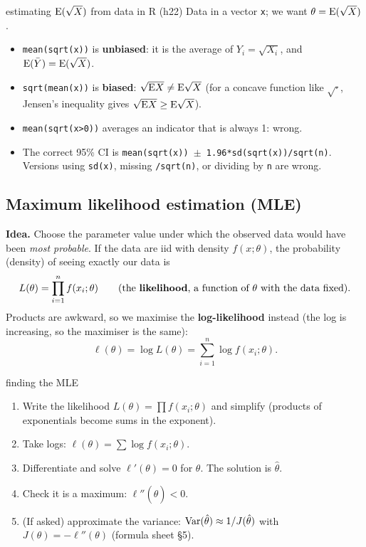 \begin{example}{estimating $\mathrm{E}(\sqrt X)$ from data in R (h22)}
Data in a vector \texttt{x}; we want $\theta = \mathrm{E}(\sqrt X)$.
\begin{itemize}
  \item \texttt{mean(sqrt(x))} is \textbf{unbiased}: it is the average of $Y_i = \sqrt{X_i}$, and $\mathrm{E}(\bar Y) = \mathrm{E}(\sqrt X)$.
  \item \texttt{sqrt(mean(x))} is \textbf{biased}: $\sqrt{\mathrm{E} X} \ne \mathrm{E}\sqrt X$ (for a concave function like $\sqrt{\cdot}$, Jensen's inequality gives $\sqrt{\mathrm{E} X} \ge \mathrm{E}\sqrt X$).
  \item \texttt{mean(sqrt(x>0))} averages an indicator that is always 1: wrong.
  \item The correct 95\% CI is \texttt{mean(sqrt(x)) $\pm$ 1.96*sd(sqrt(x))/sqrt(n)}. Versions using \texttt{sd(x)}, missing \texttt{/sqrt(n)}, or dividing by \texttt{n} are wrong.
\end{itemize}
\end{example}

\subsection{Maximum likelihood estimation (MLE)}
\textbf{Idea.} Choose the parameter value under which the observed data would have been \emph{most probable}. If the data are iid with density $f(x;\theta)$, the probability (density) of seeing exactly our data is
\[
L(\theta) = \prod_{i=1}^n f(x_i;\theta) \qquad\text{(the \textbf{likelihood}, a function of } \theta\text{ with the data fixed)}.
\]
Products are awkward, so we maximise the \textbf{log-likelihood} instead (the log is increasing, so the maximiser is the same):
\[
\ell(\theta) = \log L(\theta) = \sum_{i=1}^n \log f(x_i;\theta).
\]

\begin{algo}{finding the MLE}
\begin{enumerate}
  \item Write the likelihood $L(\theta) = \prod f(x_i;\theta)$ and simplify (products of exponentials become sums in the exponent).
  \item Take logs: $\ell(\theta) = \sum \log f(x_i;\theta)$.
  \item Differentiate and solve $\ell'(\theta) = 0$ for $\theta$. The solution is $\hat\theta$.
  \item Check it is a maximum: $\ell''(\hat\theta) < 0$.
  \item (If asked) approximate the variance: $\mathrm{Var}(\hat\theta) \approx 1/J(\hat\theta)$ with $J(\theta) = -\ell''(\theta)$ (formula sheet \S5).
\end{enumerate}
\end{algo}

